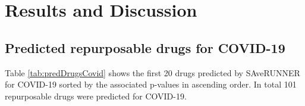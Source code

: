 \section{Results and Discussion}
\label{sec:methodology}






\subsection{Predicted repurposable drugs for COVID-19}

Table \ref{tab:predDrugsCovid} shows the first 20 drugs predicted by SAveRUNNER for COVID-19 sorted by the associated p-values in ascending order. In total 101 repurposable drugs were predicted for COVID-19.

